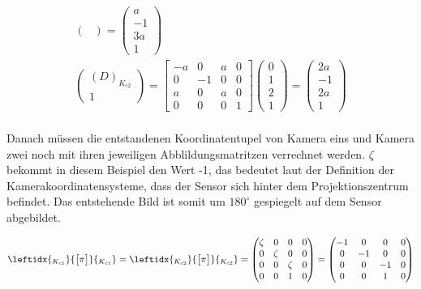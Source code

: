 \begin{gather}
\begin{pmatrix}
	\end{pmatrix}
	=
	\begin{pmatrix}
		a\\-1\\3a\\1
	\end{pmatrix}\\
	\begin{pmatrix}
		(D)_{K_{c2}}\\1
	\end{pmatrix}
	=
	\begin{bmatrix}
		-a&0&a&0\\
		0&-1&0&0\\
		a&0&a&0\\
		0&0&0&1
	\end{bmatrix}
	\begin{pmatrix}
		0\\1\\2\\1
	\end{pmatrix}
	=
	\begin{pmatrix}
		2a\\-1\\2a\\1
	\end{pmatrix}
\end{gather}\\

Danach müssen die entstandenen Koordinatentupel von Kamera eins und Kamera zwei noch mit ihren jeweiligen Abblildungsmatritzen verrechnet werden. $\zeta$ bekommt in diesem Beispiel den Wert -1, das bedeutet laut der Definition der Kamerakoordinatensysteme, dass der Sensor sich hinter dem Projektionszentrum befindet. Das entstehende Bild ist somit um \ensuremath{180^\circ} gespiegelt auf dem Sensor abgebildet.

\begin{gather}
	\leftidx{_{K_{c1}}}{\begin{bmatrix}
			\pi
	\end{bmatrix}}{_{K_{c1}}}
	=		\leftidx{_{K_{c2}}}{\begin{bmatrix}
			\pi
	\end{bmatrix}}{_{K_{c2}}}
	=
	\begin{pmatrix}
		\zeta&0&0&0\\
		0&\zeta&0&0\\
		0&0&\zeta&0\\
		0&0&1&0
	\end{pmatrix}=
	\begin{pmatrix}
		-1&0&0&0\\
		0&-1&0&0\\
		0&0&-1&0\\
		0&0&1&0
	\end{pmatrix}
\end{gather}

